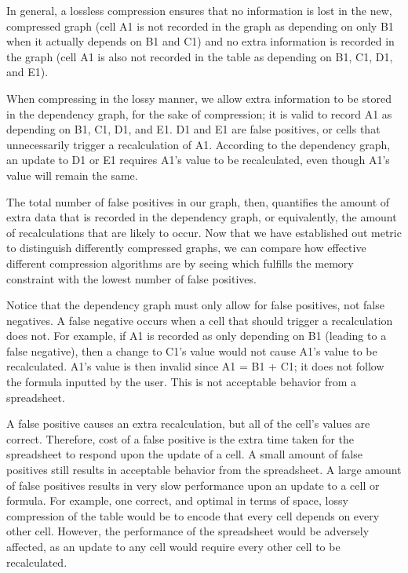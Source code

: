 \documentclass[11pt]{article}
\begin{document}
In general, a lossless compression ensures that no information is lost in the new, compressed graph (cell A1 is not recorded in the graph as depending on only B1 when it actually depends on B1 and C1) and no extra information is recorded in the graph (cell A1 is also not recorded in the table as depending on B1, C1, D1, and E1).

When compressing in the lossy manner, we allow extra information to be stored in the dependency graph, for the sake of compression; it is valid to record A1 as depending on B1, C1, D1, and E1. D1 and E1 are false positives, or cells that unnecessarily trigger a recalculation of A1. According to the dependency graph, an update to D1 or E1 requires A1’s value to be recalculated, even though A1’s value will remain the same. 

The total number of false positives in our graph, then, quantifies the amount of extra data that is recorded in the dependency graph, or equivalently, the amount of recalculations that are likely to occur. Now that we have established out metric to distinguish differently compressed graphs, we can compare how effective different compression algorithms are by seeing which fulfills the memory constraint with the lowest number of false positives.

Notice that the dependency graph must only allow for false positives, not false negatives. A false negative occurs when a cell that should trigger a recalculation does not. For example, if A1 is recorded as only depending on B1 (leading to a false negative), then a change to C1’s value would not cause A1’s value to be recalculated. A1’s value is then invalid since A1 = B1 + C1; it does not follow the formula inputted by the user. This is not acceptable behavior from a spreadsheet. 

A false positive causes an extra recalculation, but all of the cell’s values are correct. Therefore, cost of a false positive is the extra time taken for the spreadsheet to respond upon the update of a cell. A small amount of false positives still results in acceptable behavior from the spreadsheet. A large amount of false positives results in very slow performance upon an update to a cell or formula. For example, one correct, and optimal in terms of space, lossy compression of the table would be to encode that every cell depends on every other cell. However, the performance of the spreadsheet would be adversely affected, as an update to any cell would require every other cell to be recalculated.
\end{document}
